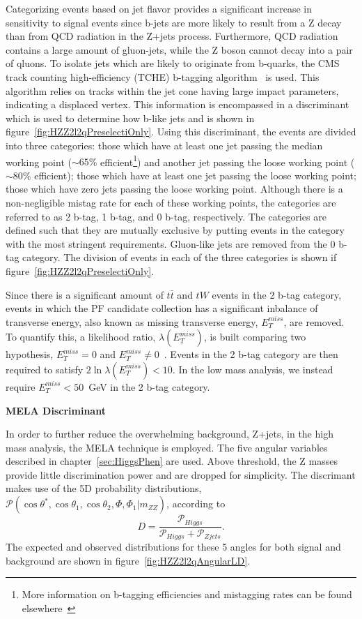 Categorizing events based on jet flavor provides a significant 
increase in sensitivity to signal events since b-jets are 
more likely to result from a Z decay than from QCD radiation
in the Z+jets process.  Furthermore, QCD radiation contains a 
large amount of gluon-jets, while the Z boson cannot decay into
a pair of qluons. 
To isolate jets which are likely to originate from b-quarks,
the CMS track 
counting high-efficiency (TCHE) b-tagging algorithm~\cite{CMS:2010hua,CMS:2012vta} 
is used.  This algorithm relies on tracks within the jet cone
having large impact parameters, indicating a displaced vertex.
This information
is encompassed in a discriminant which is used
to determine how b-like jets and is shown in
figure~\ref{fig:HZZ2l2qPreselectiOnly}.
Using this discriminant, the events are divided into three
categories: those which have at least one jet passing the median 
working point ($\sim65\%$ efficient\footnote{More information 
on b-tagging efficiencies and mistagging rates can be found 
elsewhere~\cite{CMS:2010hua,CMS:2012vta}}) and another jet passing the
loose working point ($\sim80\%$ efficient); those which have at 
least one jet passing the loose working point; those which 
have zero jets passing the loose working point.  Although there 
is a non-negligible mistag rate for each of these working points, 
the categories are referred to as 2 b-tag, 1 b-tag, and 
0 b-tag, respectively. The categories are defined such that 
they are mutually exclusive by putting events in the category 
with the most stringent requirements.  Gluon-like jets are 
removed from the 0 b-tag category.  The division of events
in each of the three categories is shown if 
figure~\ref{fig:HZZ2l2qPreselectiOnly}.

Since there is a significant amount of $t\bar{t}$ and $tW$ 
events in the 2 b-tag category, events in which the PF candidate
collection has a significant inbalance of transverse energy, 
also known as missing transverse energy, $E_T^{miss}$, are removed.
To quantify this, a likelihood ratio, $\lambda(E_T^{miss})$,
is built comparing two hypothesis, $E_T^{miss}=0$ and 
$E_T^{miss}\neq 0$~\cite{Chatrchyan:2011tn}.  Events in the 2 b-tag category are then 
required to satisfy $2\ln\lambda(E_T^{miss})<10$.  In the 
low mass analysis, we instead require $E_T^{miss}<50$~GeV in
the 2 b-tag category.    

\begin{center}
{\bf MELA Discriminant}
\end{center}
In order to further reduce the overwhelming background, Z+jets,
in the high mass analysis, the MELA technique is employed.  
The five angular variables described in 
chapter~\ref{sec:HiggsPhen} are used.  Above threshold, the 
Z masses provide little discrimination power and are dropped 
for simplicity.  The discrimant makes use of the 
5D probability distributions, 
$\mathscr{P}(\cos\theta^*,\cos\theta_1,\cos\theta_2,\Phi,\Phi_1|m_{ZZ})$,
according to
\begin{equation}
D = \frac{\mathscr{P}_{Higgs}}{\mathscr{P}_{Higgs}+\mathscr{P}_{Zjets}}.
\label{eq:KD}
\end{equation}
The expected and observed
distributions for these 5 angles for both signal and background
are shown in figure~\ref{fig:HZZ2l2qAngularLD}.


